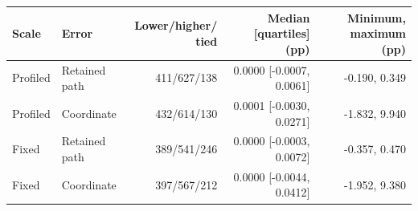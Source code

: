 \begin{tabular}{llrrr}
\toprule
Scale & Error & \shortstack{Lower/higher/\\tied} & \shortstack{Median [quartiles]\\(pp)} & \shortstack{Minimum, maximum\\(pp)}\\
\midrule
Profiled & Retained path & 411/627/138 & 0.0000 [-0.0007, 0.0061] & -0.190, 0.349\\
Profiled & Coordinate & 432/614/130 & 0.0001 [-0.0030, 0.0271] & -1.832, 9.940\\
Fixed & Retained path & 389/541/246 & 0.0000 [-0.0003, 0.0072] & -0.357, 0.470\\
Fixed & Coordinate & 397/567/212 & 0.0000 [-0.0044, 0.0412] & -1.952, 9.380\\
\bottomrule
\end{tabular}

